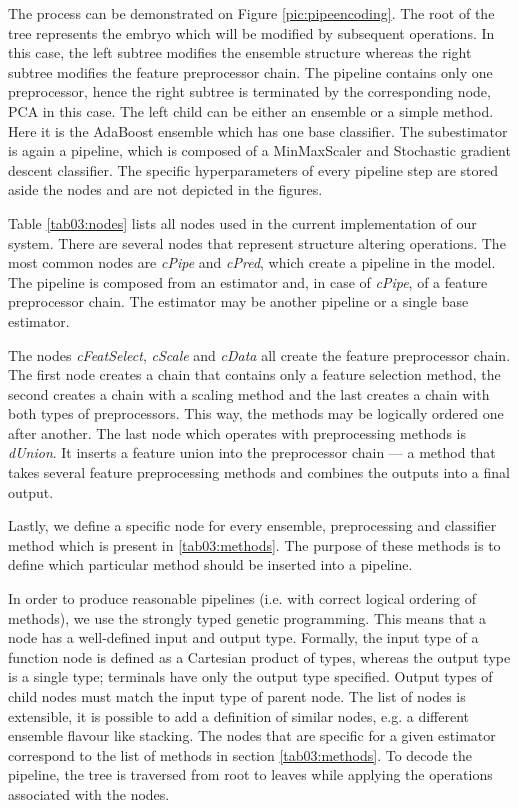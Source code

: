The process can be demonstrated on Figure
\ref{pic:pipeencoding}. The root of the tree represents the embryo which will
be modified by subsequent operations. In this case, the left subtree modifies
the ensemble structure whereas the right subtree modifies the feature
preprocessor chain. The pipeline contains only one preprocessor, hence the
right subtree is terminated by the corresponding node, PCA in this case. The
left child can be
either an ensemble or a simple method. Here it is the AdaBoost ensemble which
has one base classifier. The subestimator is again a pipeline, which is composed
of a MinMaxScaler and Stochastic gradient descent classifier. The specific
hyperparameters of every pipeline step are stored aside the nodes and are not
depicted in the figures.

\label{sec:decoding}
Table \ref{tab03:nodes} lists all nodes used in the current implementation of
our system. There are several nodes that represent structure altering
operations. The most common nodes are \emph{cPipe} and \emph{cPred}, which
create a pipeline in the model. The pipeline is composed from an estimator
and, in case of \emph{cPipe}, of a feature preprocessor chain. The estimator
may be another pipeline or a single base estimator.

The nodes \emph{cFeatSelect}, \emph{cScale} and \emph{cData} all create the feature
preprocessor chain. The first node creates a chain that contains only a
feature selection method, the second creates a chain with a scaling method
and the last creates a chain with both types of preprocessors. This way, the
methods may be logically ordered one after another. The last node which
operates with preprocessing methods is \emph{dUnion}. It inserts a feature union
into the preprocessor chain --- a method that takes several feature
preprocessing methods and combines the outputs into a final output.

Lastly, we define a specific node for every ensemble, preprocessing and
classifier method which is present in \ref{tab03:methods}. The purpose of
these methods is to define which particular method should be inserted into
a pipeline.

In order to produce reasonable pipelines (i.e. with correct logical ordering of
methods), we use the strongly typed genetic programming.
This means that a node has a well-defined input and output type.
Formally, the input type of a function node is defined as a Cartesian product of types,
whereas the output type is a single type; terminals have only the output type
specified. Output types of
child nodes must match the input type of parent node. The list of nodes
is extensible,
it is possible to add a definition of similar nodes, e.g. a different ensemble
flavour like stacking. The nodes that are specific for a given estimator
correspond to the list of methods in section \ref{tab03:methods}. To decode
the pipeline, the tree is traversed from root to leaves while applying the
operations associated with the nodes.


